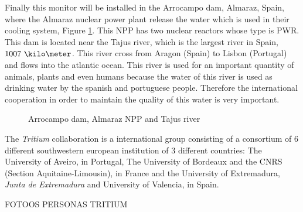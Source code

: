 Finally this monitor will be installed in the Arrocampo dam, Almaraz, Spain, where the Almaraz nuclear power plant release the water which is used in their cooling system, Figure \ref{fig:Arrocampo}. This NPP has two nuclear reactors whose type is PWR. This dam is located near the Tajus river, which is the largest river in Spain, $1007~\kilo\meter$. This river cross from Aragon (Spain) to Lisbon (Portugal) and flows into the atlantic ocean. This river is used for an important quantity of animals, plants and even humans because the water of this river is used as drinking water by the spanish and portuguese people. Therefore the international cooperation in order to maintain the quality of this water is very important.

\begin{figure}[hbtp]
 \centering
 \caption{Arrocampo dam, Almaraz NPP and Tajus river}
 \label{fig:Arrocampo}
\end{figure}

The \textit{Tritium} collaboration is a international group consisting of a consortium of 6 different southwestern european institution of 3 different countries: The University of Aveiro, in Portugal, The University of Bordeaux and the CNRS  (Section Aquitaine-Limousin), in France and the University of Extremadura, \textit{Junta de Extremadura} and University of Valencia, in Spain.

FOTOOS PERSONAS TRITIUM

